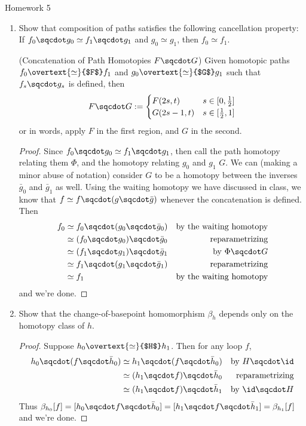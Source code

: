 \documentclass[12pt,letterpaper]{article}
\begin{document}
\pagestyle{fancy}
\begin{center}
{\Large Homework 5}%
\end{center}

\begin{enumerate}
\item Show that composition of paths satisfies the following cancellation property: If $f_0\sqcdot g_0\simeq f_1\sqcdot g_1$ and $g_{0}\simeq g_1$, then $f_0\simeq f_1$. 
\begin{definition*}(Concatenation of Path Homotopies $F\sqcdot G$)
Given homotopic paths $f_0\overtext{\simeq}{$F$} f_1$ and $g_0\overtext{\simeq}{$G$} g_1$ such that $f_s\sqcdot g_s$ is defined, then 
$$F\sqcdot G:=\begin{cases}
F(2s,t) & s\in [0,\frac{1}{2}] \\
G(2s-1,t) & s\in [\frac{1}{2},1] \\
\end{cases}$$
or in words, apply $F$ in the first region, and $G$ in the second. 
\end{definition*}
\begin{proof}
Since $f_0\sqcdot g_0\simeq f_1\sqcdot g_1$, then call the path homotopy relating them $\Phi$, and the homotopy relating $g_0$ and $g_1$ $G$. We can (making a minor abuse of notation) consider $G$ to be a homotopy between the inverses $\bar{g}_0$ and $\bar{g}_1$ as well. Using the waiting homotopy we have discussed in class, we know that $f\simeq f\sqcdot (g\sqcdot\bar{g})$ whenever the concatenation is defined. Then 
\begin{align*}
f_0 &\simeq f_0\sqcdot (g_0 \sqcdot \bar{g}_0) &\text{by the waiting homotopy}\\
&\simeq (f_0\sqcdot g_0) \sqcdot \bar{g}_0 &\text{reparametrizing}\\
&\simeq (f_1\sqcdot g_1) \sqcdot \bar{g}_1 &\text{by $\Phi \sqcdot G$}  \\
&\simeq f_1\sqcdot (g_1 \sqcdot \bar{g}_1) &\text{reparametrizing}\\
&\simeq f_1 &\text{by the waiting homotopy}
\end{align*}
and we're done.
\end{proof}

\item Show that the change-of-basepoint homomorphism $\beta_h$ depends only on the homotopy class of $h$. 
\begin{proof}
Suppose $h_0\overtext{\simeq}{$H$} h_1$. Then for any loop $f$, 
\begin{align*}
h_0\sqcdot(f\sqcdot\bar{h}_0) &\simeq h_1\sqcdot(f\sqcdot\bar{h}_0) &\text{by } H\sqcdot\id \\
&\simeq (h_1\sqcdot f) \sqcdot\bar{h}_0 &\text{reparametrizing}\\
&\simeq (h_1\sqcdot f) \sqcdot\bar{h}_1 &\text{by } \id\sqcdot H	
\end{align*}
Thus $\beta_{h_0}[f]=[h_0\sqcdot f\sqcdot\bar{h}_0]=[h_1\sqcdot f\sqcdot\bar{h}_1]=\beta_{h_1}[f]$ and we're done.
\end{proof}


\end{enumerate}
\end{document}
